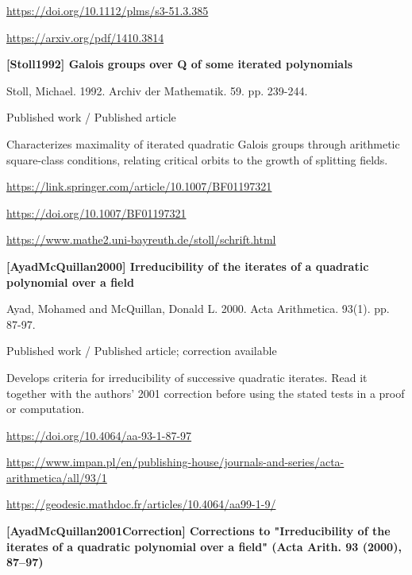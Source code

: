 \documentclass[11pt,a4paper,oneside,openany]{book}
\begin{document}
{\footnotesize\url{https://doi.org/10.1112/plms/s3-51.3.385}}\par
{\footnotesize\url{https://arxiv.org/pdf/1410.3814}}\par
\vspace{9pt}
\hypertarget{ref:Stoll1992}{}
{\sffamily\bfseries\color{atlasgreen}[Stoll1992] Galois groups over Q of some iterated polynomials}\par
\color{black} Stoll, Michael. 1992. Archiv der Mathematik. 59. pp. 239-244.\par
{\small\sffamily\color{atlasgold}Published work / Published article}\par
\color{black} Characterizes maximality of iterated quadratic Galois groups through arithmetic square-class conditions, relating critical orbits to the growth of splitting fields.\par
{\footnotesize\url{https://link.springer.com/article/10.1007/BF01197321}}\par
{\footnotesize\url{https://doi.org/10.1007/BF01197321}}\par
{\footnotesize\url{https://www.mathe2.uni-bayreuth.de/stoll/schrift.html}}\par
\vspace{9pt}
\hypertarget{ref:AyadMcQuillan2000}{}
{\sffamily\bfseries\color{atlasgreen}[AyadMcQuillan2000] Irreducibility of the iterates of a quadratic polynomial over a field}\par
\color{black} Ayad, Mohamed and McQuillan, Donald L. 2000. Acta Arithmetica. 93(1). pp. 87-97.\par
{\small\sffamily\color{atlasgold}Published work / Published article; correction available}\par
\color{black} Develops criteria for irreducibility of successive quadratic iterates. Read it together with the authors' 2001 correction before using the stated tests in a proof or computation.\par
{\footnotesize\url{https://doi.org/10.4064/aa-93-1-87-97}}\par
{\footnotesize\url{https://www.impan.pl/en/publishing-house/journals-and-series/acta-arithmetica/all/93/1}}\par
{\footnotesize\url{https://geodesic.mathdoc.fr/articles/10.4064/aa99-1-9/}}\par
\vspace{9pt}
\hypertarget{ref:AyadMcQuillan2001Correction}{}
{\sffamily\bfseries\color{atlasgreen}[AyadMcQuillan2001Correction] Corrections to "Irreducibility of the iterates of a quadratic polynomial over a field" (Acta Arith. 93 (2000), 87--97)}\par
\end{document}
